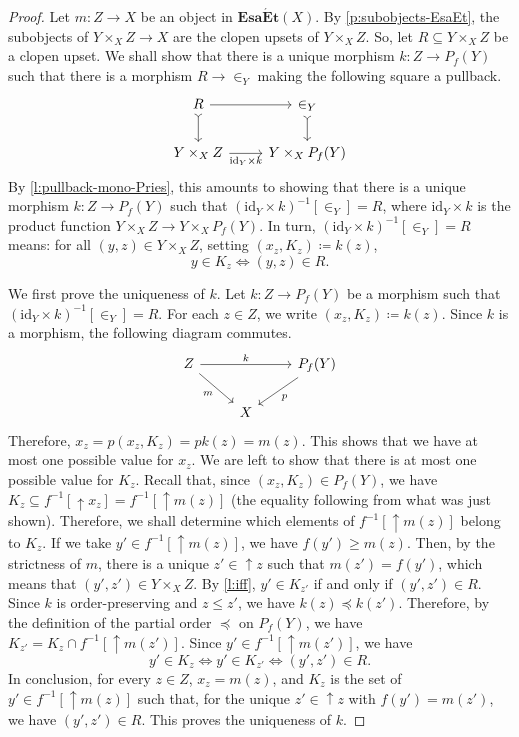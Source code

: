\documentclass[12pt]{amsart}
\theoremstyle{plain}
\theoremstyle{definition}
\newcommand{\cat}[1]{\mathbf{#1}}
\newcommand{\id}{\mathrm{id}}
\newcommand{\EsaEt}{\cat{Esa\acute{E}t}}
\renewcommand{\u}{{\uparrow}}
\begin{document}
\begin{proof}
    Let $m \colon Z\to X$ be an object in $\EsaEt(X)$.
    By \cref{p:subobjects-EsaEt}, the subobjects of $Y\times_{X}Z \to X$ are the clopen upsets of $Y\times_{X}Z$.
    So, let $R\subseteq Y\times_{X}Z$ be a clopen upset. 
    We shall show that there is a unique morphism $k \colon Z\to P_{f}(Y)$ such that there is a morphism $R \to {\in_Y}$ making the following square a pullback.
    \[
        \begin{tikzcd}
            R \arrow[d, tail] \arrow[r]                    & \in_{Y} \arrow[d, tail] \\
            Y\times_X Z \arrow[r, "\id_{Y}\times k"'] & Y\times_X P_f(Y)
        \end{tikzcd}
    \]
    By \cref{l:pullback-mono-Pries}, this amounts to showing that there is a unique morphism $k \colon Z\to P_{f}(Y)$ such that $(\id_Y \times k)^{-1}[\in_Y] = R$, where $\id_Y \times k$ is the product function $Y\times_X Z \to Y\times_X P_f(Y)$.
    In turn, $(\id_Y \times k)^{-1}[\in_Y] = R$ means: for all $(y,z) \in Y \times_X Z$, setting $(x_{z},K_{z}) \coloneqq k(z)$, 
    \begin{equation} \label{l:iff}
        y \in K_{z} \iff (y,z) \in R.
    \end{equation}

    We first prove the uniqueness of $k$.
    Let $k \colon Z\to P_{f}(Y)$ be a morphism such that $(\id_Y \times k)^{-1}[\in_Y] = R$.
    For each $z \in Z$, we write $(x_z,K_z)\coloneqq k(z)$.
    Since $k$ is a morphism, the following diagram commutes.
    \[
        \begin{tikzcd}
            Z \arrow[swap]{rd}{m}\arrow{rr}{k} & & P_f(Y)\arrow{ld}{p}\\
            & X
        \end{tikzcd}
    \]
    Therefore, $x_z = p(x_z, K_z) = pk(z) = m(z)$.
    This shows that we have at most one possible value for $x_z$.
    We are left to show that there is at most one possible value for $K_z$.
    Recall that, since $(x_z, K_z) \in P_f(Y)$, we have $K_{z}\subseteq f^{-1}[{\u}x_{z}]=f^{-1}[{\u}m(z)]$ (the equality following from what was just shown). 
    Therefore, we shall determine which elements of $f^{-1}[\u m(z)]$ belong to $K_z$.
    If we take $y' \in f^{-1}[\u m(z)]$, we have $f(y') \geq m(z)$.
    Then, by the strictness of $m$, there is a unique $z' \in \u z$ such that $m(z') = f(y')$, which means that $(y',z')\in Y\times_{X}Z$.
    By \eqref{l:iff}, $y' \in K_{z'}$ if and only if $(y', z') \in R$.
    Since $k$ is order-preserving and $z \leq z'$, we have $k(z) \preceq k(z')$.
    Therefore, by the definition of the partial order $\preceq$ on $P_f(Y)$, we have $K_{z'} = K_z \cap f^{-1}[\u m(z')]$.
    Since $y' \in f^{-1}[\u m(z')]$, we have
    \[
    y' \in K_z \iff y' \in K_{z'} \iff (y', z') \in R.
    \]
    In conclusion, for every $z \in Z$, $x_z = m(z)$, and $K_z$ is the set of $y' \in f^{-1}[\u m(z)]$ such that, for the unique $z' \in \u z$ with $f(y') = m(z')$, we have $(y', z') \in R$.
    This proves the uniqueness of $k$.


\end{proof}
\end{document}

